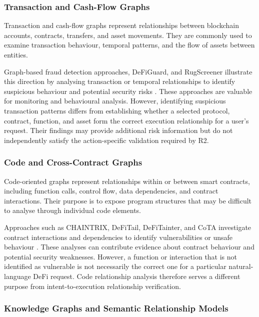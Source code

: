 \subsubsection{Transaction and Cash-Flow Graphs}

Transaction and cash-flow graphs represent relationships
between blockchain accounts, contracts, transfers, and
asset movements. They are commonly used to examine
transaction behaviour, temporal patterns, and the flow
of assets between entities.

Graph-based fraud detection approaches, DeFiGuard, and
RugScreener illustrate this direction by analysing
transaction or temporal relationships to identify
suspicious behaviour and potential security risks
\cite{TODO_DeFiGraphTransformerFraud,
TODO_DeFiGuard,TODO_RugScreener}. These approaches are valuable for monitoring and
behavioural analysis. However, identifying suspicious
transaction patterns differs from establishing whether
a selected protocol, contract, function, and asset
form the correct execution relationship for a user's
request. Their findings may provide additional risk
information but do not independently satisfy the
action-specific validation required by R2.

\subsubsection{Code and Cross-Contract Graphs}

Code-oriented graphs represent relationships within
or between smart contracts, including function calls,
control flow, data dependencies, and contract
interactions. Their purpose is to expose program
structures that may be difficult to analyse through
individual code elements.

Approaches such as CHAINTRIX, DeFiTail, DeFiTainter,
and CoTA investigate contract interactions and
dependencies to identify vulnerabilities or unsafe
behaviour
\cite{TODO_CHAINTRIX,TODO_DeFiTail,
TODO_DeFiTainter,TODO_CoTA}. These analyses can contribute evidence about contract
behaviour and potential security weaknesses. However,
a function or interaction that is not identified as
vulnerable is not necessarily the correct one for
a particular natural-language DeFi request. Code
relationship analysis therefore serves a different
purpose from intent-to-execution relationship
verification.

\subsubsection{Knowledge Graphs and Semantic Relationship Models}

